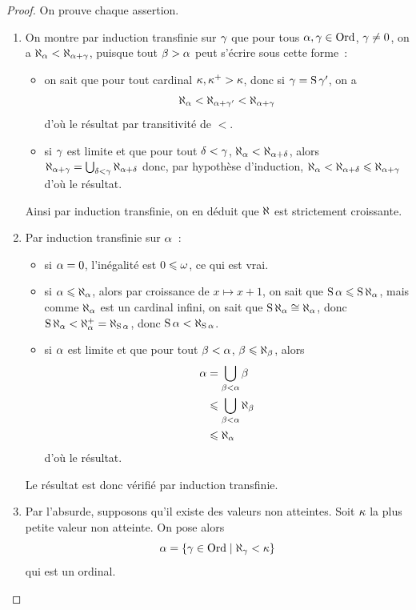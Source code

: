 \begin{proof}
  On prouve chaque assertion.
  \begin{enumerate}[label=(\roman*)]
  \item On montre par induction transfinie sur $\gamma$ que pour tous
    $\alpha,\gamma \in \operatorname{Ord}$, $\gamma\neq 0$, on a
    $\aleph_{\alpha} < \aleph_{\alpha + \gamma}$, puisque tout $\beta > \alpha$ peut
    s'écrire sous cette forme~:
    \begin{itemize}
    \item on sait que pour tout cardinal $\kappa, \kappa^{+}>\kappa$, donc si
      $\gamma = \operatorname{S}\gamma'$, on a
      \[\aleph_{\alpha} < \aleph_{\alpha + \gamma'} < \aleph_{\alpha + \gamma}\]
      d'où le résultat par transitivité de $<$.
    \item si $\gamma$ est limite et que pour tout $\delta < \gamma$,
      $\aleph_{\alpha} < \aleph_{\alpha + \delta}$, alors
      $\aleph_{\alpha + \gamma} = \bigcup_{\delta < \gamma} \aleph_{\alpha + \delta}$
      donc, par hypothèse d'induction,
      $\aleph_{\alpha} < \aleph_{\alpha + \delta} \leqslant \aleph_{\alpha + \gamma}$
      d'où le résultat.
    \end{itemize}
    Ainsi par induction transfinie, on en déduit que $\aleph$ est strictement
    croissante.
  \item Par induction transfinie sur $\alpha$~:
    \begin{itemize}
    \item si $\alpha = 0$, l'inégalité est $0\leqslant \omega$, ce qui est vrai.
    \item si $\alpha \leqslant \aleph_\alpha$, alors par croissance de
      $x\mapsto x + 1$, on sait que $\operatorname{S}\alpha \leqslant \operatorname{S}\aleph_\alpha$, mais
      comme $\aleph_\alpha$ est un cardinal infini, on sait que
      $\operatorname{S}\aleph_\alpha \cong \aleph_\alpha$, donc
      $\operatorname{S}\aleph_\alpha < \aleph_\alpha^{+} = \aleph_{\operatorname{S}\alpha}$, donc
      $\operatorname{S}\alpha < \aleph_{\operatorname{S}\alpha}$.
    \item si $\alpha$ est limite et que pour tout $\beta < \alpha$,
      $\beta \leqslant \aleph_\beta$, alors
      \begin{align*}
        \alpha &= \bigcup_{\beta < \alpha} \beta\\
        &\leqslant \bigcup_{\beta < \alpha} \aleph_\beta\\
        &\leqslant \aleph_\alpha
      \end{align*}
      d'où le résultat.
    \end{itemize}
    Le résultat est donc vérifié par induction transfinie.
  \item Par l'absurde, supposons qu'il existe des valeurs non atteintes. Soit
    $\kappa$ la plus petite valeur non atteinte. On pose alors
    \[\alpha = \left\{ \gamma \in \operatorname{Ord} \;\middle\vert\; \aleph_\gamma < \kappa \right\}\]
    qui est un ordinal.
    

\end{enumerate}
\end{proof}
